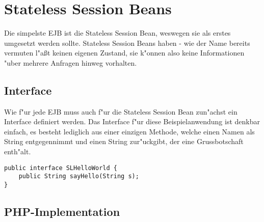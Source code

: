 \section{Stateless Session Beans}
\label{sec:chap2:slsb}

Die simpelste EJB ist die Stateless Session Bean, weswegen sie als erstes umgesetzt werden sollte.
Stateless Session Beans haben - wie der Name bereits vermuten l"a\ss t keinen eigenen Zustand, sie
k"onnen also keine Informationen "uber mehrere Anfragen hinweg vorhalten.

\subsection{Interface}
\label{sec:chap2:slsb:if}
Wie f"ur jede EJB muss auch f"ur die Stateless Session Bean zun"achst ein Interface definiert werden.
Das Interface f"ur diese Beispielanwendung ist denkbar einfach, es besteht lediglich aus einer einzigen
Methode, welche einen Namen als String entgegennimmt und einen String zur"uckgibt, der eine
Grussbotschaft enth"alt. 
\begin{lstlisting}[caption=Stateless Hello World Interface]
public interface SLHelloWorld {
    public String sayHello(String s);
}
\end{lstlisting}

\subsection{PHP-Implementation}
\label{sec:chap2:slsb:impl}

